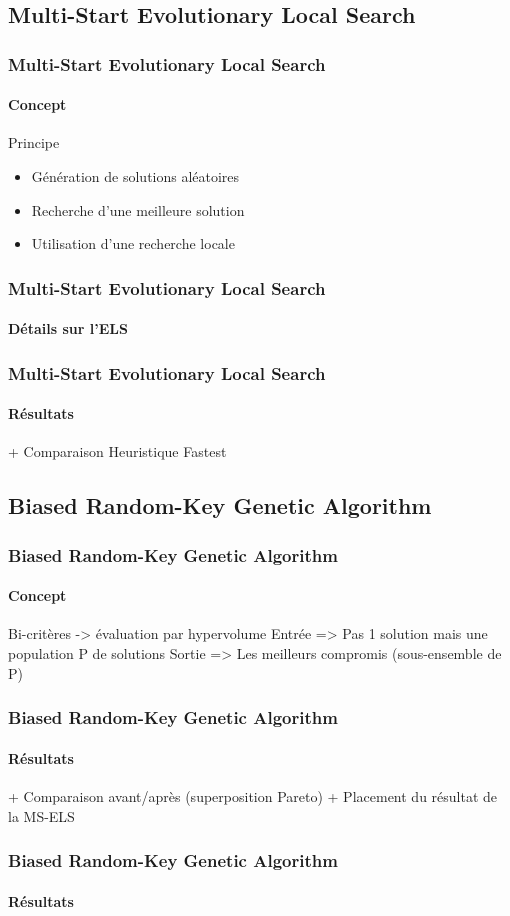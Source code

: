 \subsection{Multi-Start Evolutionary Local Search}
\begin{frame}
	\frametitle{Multi-Start Evolutionary Local Search}
	\framesubtitle{Concept}
	\begin{block}{Principe}
		\begin{itemize}
			\item Génération de solutions aléatoires
			\item Recherche d'une meilleure solution
			\item Utilisation d'une recherche locale
		\end{itemize}
	\end{block}
\end{frame}
\begin{frame}
	\frametitle{Multi-Start Evolutionary Local Search}
	\framesubtitle{Détails sur l'ELS}
	\centering
	\begin{tikzpicture}[scale=.5,transform shape,node distance=1cm]
		
	\end{tikzpicture}
\end{frame}
\begin{frame}
	\frametitle{Multi-Start Evolutionary Local Search}
	\framesubtitle{Résultats}
	+ Comparaison Heuristique Fastest
\end{frame}

\subsection{Biased Random-Key Genetic Algorithm}
\begin{frame}
	\frametitle{Biased Random-Key Genetic Algorithm}
	\framesubtitle{Concept}
	Bi-critères -> évaluation par hypervolume
	Entrée => Pas 1 solution mais une population P de solutions
	Sortie => Les meilleurs compromis (sous-ensemble de P)
\end{frame}
\begin{frame}
	\frametitle{Biased Random-Key Genetic Algorithm}
	\framesubtitle{Résultats}
	+ Comparaison avant/après (superposition Pareto)
	+ Placement du résultat de la MS-ELS
\end{frame}
\begin{frame}
	\frametitle{Biased Random-Key Genetic Algorithm}
	\framesubtitle{Résultats}
	
\end{frame}
